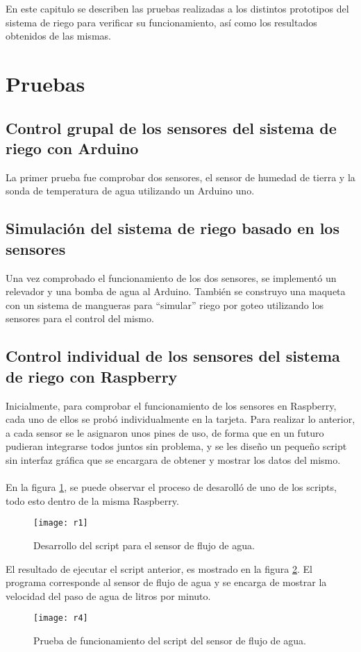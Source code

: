 En este capitulo se describen las pruebas realizadas a los distintos prototipos del sistema de riego para verificar su funcionamiento, as\'i como los resultados obtenidos de las mismas.

\section{Pruebas}
\subsection{Control grupal de los sensores del sistema de riego con Arduino}
La primer prueba fue comprobar dos sensores, el sensor de humedad de tierra y la sonda de temperatura de agua utilizando un Arduino uno.

\subsection{Simulaci\'on del sistema de riego basado en los sensores}
Una vez comprobado el funcionamiento de los dos sensores, se implement\'o un relevador y una bomba de agua al Arduino. Tambi\'en se construyo una maqueta con un sistema de mangueras para ``simular'' riego por goteo utilizando los sensores para el control del mismo.


\subsection{Control individual de los sensores del sistema de riego con Raspberry}
Inicialmente, para comprobar el funcionamiento de los sensores en Raspberry, cada uno de ellos se prob\'o individualmente en la tarjeta. Para realizar lo anterior, a cada sensor se le asignaron unos pines de uso, de forma que en un futuro pudieran integrarse todos juntos sin problema, y se les dise\~{n}o un peque\~{n}o script sin interfaz gr\'afica que se encargara de obtener y mostrar los datos del mismo.\\\\
En la figura \ref{r1}, se puede observar el proceso de desaroll\'o de uno de los scripts, todo esto dentro de la misma Raspberry.
\begin{figure}[H]
\begin{center}
	\texttt{[image: r1]}
\end{center}
	\caption{Desarrollo del script para el sensor de flujo de agua.}
	\label{r1}
\end{figure} 
El resultado de ejecutar el script anterior, es mostrado en la figura \ref{r4}. El programa corresponde al sensor de flujo de agua y se encarga de mostrar la velocidad del paso de agua de litros por minuto.
\begin{figure}[H]
	\begin{center}
		\texttt{[image: r4]}
	\end{center}
	\caption{Prueba de funcionamiento del script del sensor de flujo de agua.}
	\label{r4}
\end{figure} 

